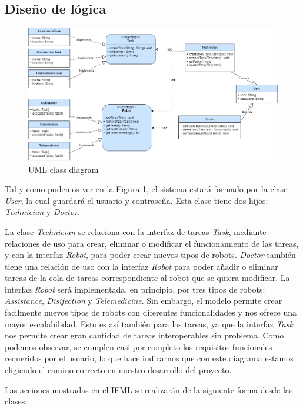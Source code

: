 \subsection{Diseño de lógica}

\begin{figure}[H]
	\centering
	\includegraphics[width=1\textwidth]{images/DiagramaClasesWeb.drawio.png}
	\caption{UML class diagram}
	\label{fig:UMLModel}
\end{figure}
 Tal y como podemos ver en la Figura \ref{fig:UMLModel}, el sistema estará formado por la clase \textit{User}, la cual guardará el usuario y contraseña. Esta clase tiene dos hijos: \textit{Technician} y \textit{Doctor}.
 
 La clase \textit{Technician} se relaciona con la interfaz de tareas \textit{Task}, mediante relaciones de uso para crear, eliminar o modificar el funcionamiento de las tareas, y con la interfaz \textit{Robot}, para poder crear nuevos tipos de robots. \textit{Doctor} también tiene una relación de uso con la interfaz \textit{Robot} para poder añadir o eliminar tareas de la cola de tareas correspondiente al robot que se quiera modificar. La interfaz \textit{Robot} será implementada, en principio, por tres tipos de robots: \textit{Assistance}, \textit{Disifection} y \textit{Telemedicine}. Sin embargo, el modelo permite crear facilmente nuevos tipos de robots con diferentes funcionalidades y nos ofrece una mayor escalabilidad. Esto es así también para las tareas, ya que la interfaz \textit{Task} nos permite crear gran cantidad de tareas interoperables sin problema. Como podemos observar, se cumplen casi por completo los requisitos funcionales requeridos por el usuario, lo que hace indicarnos que con este diagrama estamos eligiendo el camino correcto en nuestro desarrollo del proyecto. 
 
Las acciones mostradas en el IFML se realizarán de la siguiente forma desde las clases:

